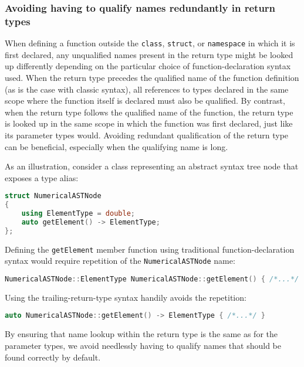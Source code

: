 \subsubsection[Avoiding having to qualify names redundantly in return types]{Avoiding having to qualify names redundantly in return types}\label{avoiding-having-to-qualify-names-redundantly-in-return-types}

When defining a function outside the \lstinline!class!, \lstinline!struct!, or
\lstinline!namespace! in which it is first declared, any unqualified names
present in the return type might be looked up differently depending on
the particular choice of function-declaration syntax used. When the
return type precedes the qualified name of the function definition (as
is the case with classic syntax), all references to types declared in
the same scope where the function itself is declared must also be
qualified. By contrast, when the return type follows the
qualified name of the function,
the return type is looked up in the same scope in which the
function was first declared, just like its parameter types would. Avoiding redundant qualification of the return type  can be beneficial, especially when the qualifying name is long.

As an illustration, consider a class representing an abstract syntax
tree node that exposes a type alias:

\begin{lstlisting}[language=C++]
struct NumericalASTNode
{
    using ElementType = double;
    auto getElement() -> ElementType;
};
\end{lstlisting}

\noindent Defining the \lstinline!getElement! member function using traditional
function-declaration syntax would require repetition of the
\lstinline!NumericalASTNode! name:

\begin{lstlisting}[language=C++]
NumericalASTNode::ElementType NumericalASTNode::getElement() { /*...*/ }
\end{lstlisting}

\noindent Using the trailing-return-type syntax handily avoids the repetition:

\begin{lstlisting}[language=C++]
auto NumericalASTNode::getElement() -> ElementType { /*...*/ }
\end{lstlisting}

\noindent By ensuring that name lookup within the return type is the same as for
the parameter types, we avoid needlessly having to qualify names that
should be found correctly by default.


